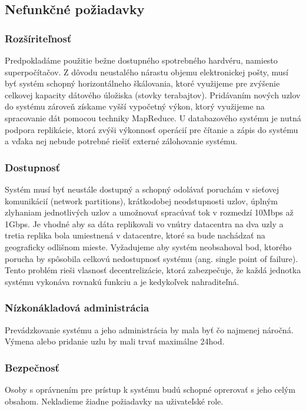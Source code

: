 \documentclass[11pt,twoside,a4paper]{book}
\begin{document}
\subsection{Nefunkčné požiadavky}

\subsubsection{Rozšíriteľnosť}
Predpokladáme použitie bežne dostupného spotrebného hardvéru, namiesto superpočítačov. Z dôvodu neustalého nárastu objemu elektronickej pošty, musí byť systém schopný horizontálneho škálovania, ktoré využijeme pre zvýšenie celkovej kapacity dátového úložiska (stovky terabajtov). Pridávaním nových uzlov do systému zároveň získame vyšší vypočetný výkon, ktorý využijeme na spracovanie dát pomocou techniky MapReduce. U databazového systému je nutná podpora replikácie, ktorá zvýši výkonnosť operácií pre čítanie a zápis do systému a vďaka nej nebude potrebné riešiť externé zálohovanie systému.

\subsubsection{Dostupnosť}
Systém musí byť neustále dostupný a schopný odolávať poruchám v sieťovej komunikácií (network partitions), krátkodobej neodstupnosti uzlov, úplným zlyhaniam jednotlivých uzlov a umožnovať spracúvať tok v rozmedzí 10Mbps až 1Gbps. Je vhodné aby sa dáta replikovali vo vnútry datacentra na dva uzly a tretia replika bola umiestnená v datacentre, ktoré sa bude nachádzať na geograficky odlišnom mieste. Vyžadujeme aby systém neobsahoval bod, ktorého porucha by spôsobila celkovú nedostupnosť systému (ang. single point of failure). Tento problém rieši vlasnosť decentrelizácie, ktorá zabezpečuje, že každá jednotka systému vykonáva rovnakú funkciu a je kedykoľvek nahraditeľná.

\subsubsection{Nízkonákladová administrácia}
Prevádzkovanie systému a jeho administrácia by mala byť čo najmenej náročná. Výmena alebo pridanie uzlu by mali trvať maximálne 24hod.

\subsubsection{Bezpečnosť}
Osoby s oprávnením pre prístup k systému budú schopné oprerovať s jeho celým obsahom. Nekladieme žiadne požiadavky na uživateľské role. 
\end{document}
